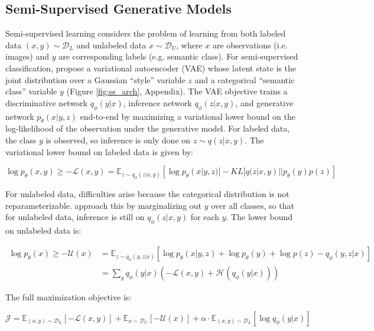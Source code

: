 \documentclass{article} %
\begin{document}
\subsection{Semi-Supervised Generative Models}

Semi-supervised learning considers the problem of learning from both labeled data $(x,y) \sim \mathcal{D}_L$ and unlabeled data $x \sim \mathcal{D}_U$, where $x$ are observations (i.e. images) and $y$ are corresponding labels (e.g. semantic class). For semi-supervised classification, \citet{kingma_ssvae} propose a variational autoencoder (VAE) whose latent state is the joint distribution over a Gaussian ``style'' variable $z$ and a categorical ``semantic class'' variable $y$ (Figure \ref{fig:ss_arch}, Appendix). The VAE objective trains a discriminative network $q_\phi(y|x)$, inference network $q_\phi(z|x,y)$, and generative network $p_\theta(x|y,z)$ end-to-end by maximizing a variational lower bound on the log-likelihood of the observation under the generative model. For labeled data, the class $y$ is observed, so inference is only done on $z \sim q(z|x,y)$. The variational lower bound on labeled data is given by:

\begin{equation} \label{eq:var_bound_labeled}
\log p_\theta(x,y) \geq -\mathcal{L}(x,y) = \mathbb{E}_{z \sim q_\phi(z|x,y)}\left[\log p_\theta(x|y,z)] - KL[q(z|x,y)||p_\theta(y)p(z)\right] 
\end{equation}


For unlabeled data, difficulties arise because the categorical distribution is not reparameterizable. \cite{kingma_ssvae} approach this by marginalizing out $y$ over all classes, so that for unlabeled data, inference is still on $q_\phi(z|x,y)$ for each $y$. The lower bound on unlabeled data is:

\begin{align} \label{eq:var_bound_unlabeled}
\log p_\theta(x) \geq -\mathcal{U}(x) & = \mathbb{E}_{z \sim q_\phi(y,z|x)}[\log p_\theta(x|y,z) + \log p_\theta(y) + \log p(z) - q_\phi(y,z|x)]  \\
& = \sum_y q_\phi(y|x) (-\mathcal{L}(x,y) + \mathcal{H}(q_\phi(y|x)))
\end{align}


The full maximization objective is:

\begin{equation} \label{eq:ssvae_objective}
\mathcal{J} = \mathbb{E}_{(x,y) \sim \mathcal{D}_L}\left[-\mathcal{L}(x,y)\right] +  \mathbb{E}_{x \sim \mathcal{D}_U}\left[-\mathcal{U}(x)\right] + \alpha \cdot \mathbb{E}_{(x,y) \sim \mathcal{D}_L}[\log q_\phi(y|x)]
\end{equation}
\end{document}
